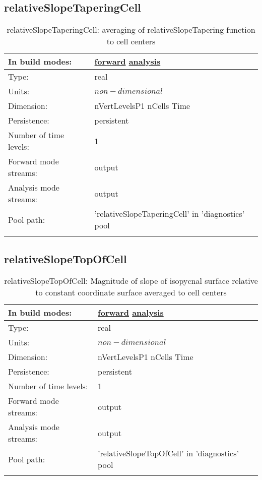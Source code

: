 \subsection[relativeSlopeTaperingCell]{relativeSlopeTaperingCell}
\label{subsec:var_sec_diagnostics_relativeSlopeTaperingCell}
\begin{center}
\begin{longtable}{| p{2.0in} | p{4.0in} |}
        \hline 
        In build modes: & \hyperref[subsec:forward_var_tab_diagnostics]{forward} \hyperref[subsec:analysis_var_tab_diagnostics]{analysis} \\
        \hline 
        Type: & real \\
        \hline 
        Units: & $non-dimensional$ \\
        \hline 
        Dimension: & nVertLevelsP1 nCells Time \\
        \hline 
        Persistence: & persistent \\
        \hline 
        Number of time levels: & 1 \\
        \hline 
		 Forward mode streams: &  output \\
        \hline 
		 Analysis mode streams: &  output \\
        \hline 
            Pool path: & 'relativeSlopeTaperingCell' in 'diagnostics' pool
 \\
		 \hline 
    \caption{relativeSlopeTaperingCell: averaging of relativeSlopeTapering function to cell centers}
\end{longtable}
\end{center}
\subsection[relativeSlopeTopOfCell]{relativeSlopeTopOfCell}
\label{subsec:var_sec_diagnostics_relativeSlopeTopOfCell}
\begin{center}
\begin{longtable}{| p{2.0in} | p{4.0in} |}
        \hline 
        In build modes: & \hyperref[subsec:forward_var_tab_diagnostics]{forward} \hyperref[subsec:analysis_var_tab_diagnostics]{analysis} \\
        \hline 
        Type: & real \\
        \hline 
        Units: & $non-dimensional$ \\
        \hline 
        Dimension: & nVertLevelsP1 nCells Time \\
        \hline 
        Persistence: & persistent \\
        \hline 
        Number of time levels: & 1 \\
        \hline 
		 Forward mode streams: &  output \\
        \hline 
		 Analysis mode streams: &  output \\
        \hline 
            Pool path: & 'relativeSlopeTopOfCell' in 'diagnostics' pool
 \\
		 \hline 
    \caption{relativeSlopeTopOfCell: Magnitude of slope of isopycnal surface relative to constant coordinate surface averaged to cell centers}
\end{longtable}
\end{center}
